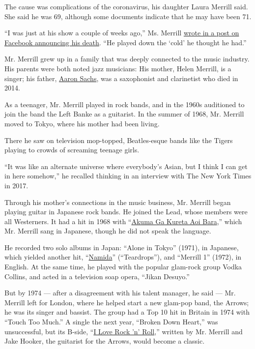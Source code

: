 The cause was complications of the coronavirus, his daughter Laura
Merrill said. She said he was 69, although some documents indicate that
he may have been 71.

``I was just at his show a couple of weeks ago,'' Ms. Merrill
\href{https://www.facebookcorewwwi.onion/iLookok/posts/10163563888920227}{wrote
in a post on Facebook announcing his death}. ``He played down the `cold'
he thought he had.''

Mr. Merrill grew up in a family that was deeply connected to the music
industry. His parents were both noted jazz musicians: His mother, Helen
Merrill, is a singer; his father,
\href{https://web.archive.org/web/20140626145656/http://news.allaboutjazz.com/aaron-sachs-and-jimmy-scott-gone.php}{Aaron
Sachs}, was a saxophonist and clarinetist who died in 2014.

As a teenager, Mr. Merrill played in rock bands, and in the 1960s
auditioned to join the band the Left Banke as a guitarist. In the summer
of 1968, Mr. Merrill moved to Tokyo, where his mother had been living.

There he saw on television mop-topped, Beatles-esque bands like the
Tigers playing to crowds of screaming teenage girls.

``It was like an alternate universe where everybody's Asian, but I think
I can get in here somehow,'' he recalled thinking in an interview with
The New York Times in 2017.

Through his mother's connections in the music business, Mr. Merrill
began playing guitar in Japanese rock bands. He joined the Lead, whose
members were all Westerners. It had a hit in 1968 with
``\href{https://www.youtube.com/watch?v=gifDVY5mYbs}{Akuma Ga Kureta Aoi
Bara},'' which Mr. Merrill sang in Japanese, though he did not speak the
language.

He recorded two solo albums in Japan: ``Alone in Tokyo'' (1971), in
Japanese, which yielded another hit,
``\href{https://www.youtube.com/watch?v=k4U9D5IB3Ms}{Namida}''
(``Teardrops''), and ``Merrill 1'' (1972), in English. At the same time,
he played with the popular glam-rock group Vodka Collins, and acted in a
television soap opera, ``Jikan Desuyo.''

But by 1974 --- after a disagreement with his talent manager, he said
--- Mr. Merrill left for London, where he helped start a new glam-pop
band, the Arrows; he was its singer and bassist. The group had a Top 10
hit in Britain in 1974 with ``Touch Too Much.'' A single the next year,
``Broken Down Heart,'' was unsuccessful, but its B-side,
``\href{https://www.youtube.com/watch?v=8AT_Pbtyid0}{I Love Rock 'n'
Roll},'' written by Mr. Merrill and Jake Hooker, the guitarist for the
Arrows, would become a classic.


